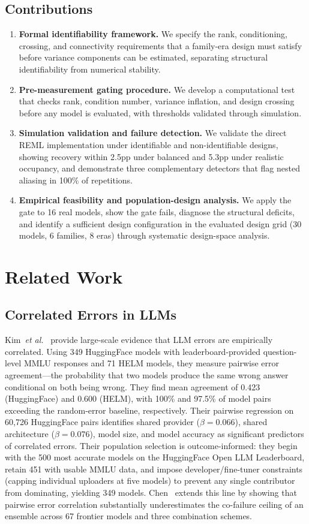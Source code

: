 \documentclass{ieeeaccess}
\theoremstyle{definition}
\theoremstyle{plain}
\begin{document}
\subsection{Contributions}
\begin{enumerate}
\item \textbf{Formal identifiability framework.} We specify the rank, conditioning, crossing, and connectivity requirements that a family-era design must satisfy before variance components can be estimated, separating structural identifiability from numerical stability.
\item \textbf{Pre-measurement gating procedure.} We develop a computational test that checks rank, condition number, variance inflation, and design crossing before any model is evaluated, with thresholds validated through simulation.
\item \textbf{Simulation validation and failure detection.} We validate the direct REML implementation under identifiable and non-identifiable designs, showing recovery within 2.5pp under balanced and 5.3pp under realistic occupancy, and demonstrate three complementary detectors that flag nested aliasing in 100\% of repetitions.
\item \textbf{Empirical feasibility and population-design analysis.} We apply the gate to 16 real models, show the gate fails, diagnose the structural deficits, and identify a sufficient design configuration in the evaluated design grid (30 models, 6 families, 8 eras) through systematic design-space analysis.
\end{enumerate}

\section{Related Work}
\label{sec:related}

\subsection{Correlated Errors in LLMs}
Kim~\textit{et al.}~\cite{kim2025} provide large-scale evidence that LLM errors are empirically correlated. Using 349 HuggingFace models with leaderboard-provided question-level MMLU responses and 71 HELM models, they measure pairwise error agreement---the probability that two models produce the same wrong answer conditional on both being wrong. They find mean agreement of 0.423 (HuggingFace) and 0.600 (HELM), with 100\% and 97.5\% of model pairs exceeding the random-error baseline, respectively. Their pairwise regression on 60,726 HuggingFace pairs identifies shared provider ($\beta = 0.066$), shared architecture ($\beta = 0.076$), model size, and model accuracy as significant predictors of correlated errors. Their population selection is outcome-informed: they begin with the 500 most accurate models on the HuggingFace Open LLM Leaderboard, retain 451 with usable MMLU data, and impose developer/fine-tuner constraints (capping individual uploaders at five models) to prevent any single contributor from dominating, yielding 349 models. Chen~\cite{chen2026} extends this line by showing that pairwise error correlation substantially underestimates the co-failure ceiling of an ensemble across 67 frontier models and three combination schemes.
\end{document}
